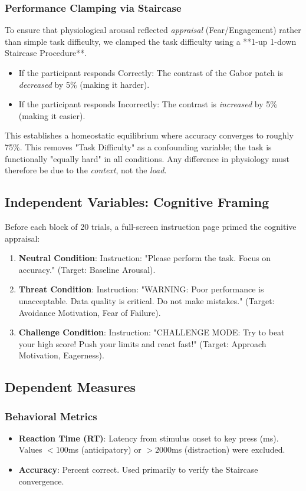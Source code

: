 \documentclass[journal]{IEEEtran}
\begin{document}
\subsubsection{Performance Clamping via Staircase}
To ensure that physiological arousal reflected \textit{appraisal} (Fear/Engagement) rather than simple task difficulty, we clamped the task difficulty using a **1-up 1-down Staircase Procedure**.
\begin{itemize}
    \item If the participant responds Correctly: The contrast of the Gabor patch is \textit{decreased} by 5\% (making it harder).
    \item If the participant responds Incorrectly: The contrast is \textit{increased} by 5\% (making it easier).
\end{itemize}
This establishes a homeostatic equilibrium where accuracy converges to roughly 75\%. This removes "Task Difficulty" as a confounding variable; the task is functionally "equally hard" in all conditions. Any difference in physiology must therefore be due to the \textit{context}, not the \textit{load}.

\subsection{Independent Variables: Cognitive Framing}
Before each block of 20 trials, a full-screen instruction page primed the cognitive appraisal:
\begin{enumerate}
    \item \textbf{Neutral Condition}: Instruction: "Please perform the task. Focus on accuracy." (Target: Baseline Arousal).
    \item \textbf{Threat Condition}: Instruction: "WARNING: Poor performance is unacceptable. Data quality is critical. Do not make mistakes." (Target: Avoidance Motivation, Fear of Failure).
    \item \textbf{Challenge Condition}: Instruction: "CHALLENGE MODE: Try to beat your high score! Push your limits and react fast!" (Target: Approach Motivation, Eagerness).
\end{enumerate}

\subsection{Dependent Measures}
\subsubsection{Behavioral Metrics}
\begin{itemize}
    \item \textbf{Reaction Time (RT)}: Latency from stimulus onset to key press (ms). Values $<100$ms (anticipatory) or $>2000$ms (distraction) were excluded.
    \item \textbf{Accuracy}: Percent correct. Used primarily to verify the Staircase convergence.
\end{itemize}
\end{document}
